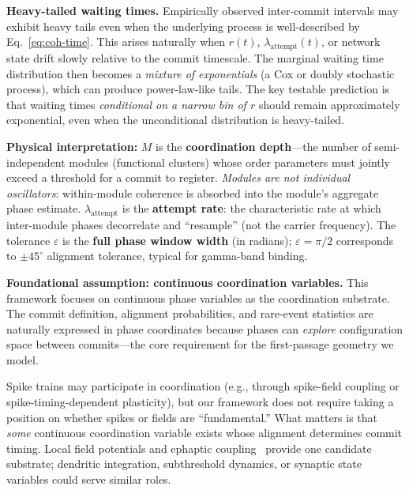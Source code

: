 \documentclass[12pt]{article}
\begin{document}
\textbf{Heavy-tailed waiting times.} Empirically observed inter-commit intervals may exhibit heavy tails even when the underlying process is well-described by Eq.~\ref{eq:coh-time}. This arises naturally when $r(t)$, $\lambda_{\mathrm{attempt}}(t)$, or network state drift slowly relative to the commit timescale. The marginal waiting time distribution then becomes a \emph{mixture of exponentials} (a Cox or doubly stochastic process), which can produce power-law-like tails. The key testable prediction is that waiting times \emph{conditional on a narrow bin of $r$} should remain approximately exponential, even when the unconditional distribution is heavy-tailed.

\textbf{Physical interpretation:} $M$ is the \textbf{coordination depth}---the number of semi-independent modules (functional clusters) whose order parameters must jointly exceed a threshold for a commit to register. \emph{Modules are not individual oscillators}: within-module coherence is absorbed into the module's aggregate phase estimate. $\lambda_{\mathrm{attempt}}$ is the \textbf{attempt rate}: the characteristic rate at which inter-module phases decorrelate and ``resample'' (not the carrier frequency). The tolerance $\varepsilon$ is the \textbf{full phase window width} (in radians); $\varepsilon = \pi/2$ corresponds to $\pm 45^\circ$ alignment tolerance, typical for gamma-band binding.

\textbf{Foundational assumption: continuous coordination variables.} This framework focuses on continuous phase variables as the coordination substrate. The commit definition, alignment probabilities, and rare-event statistics are naturally expressed in phase coordinates because phases can \emph{explore} configuration space between commits---the core requirement for the first-passage geometry we model.

Spike trains may participate in coordination (e.g., through spike-field coupling or spike-timing-dependent plasticity), but our framework does not require taking a position on whether spikes or fields are ``fundamental.'' What matters is that \emph{some} continuous coordination variable exists whose alignment determines commit timing. Local field potentials and ephaptic coupling~\cite{anastassiou2011,pinotsis2023} provide one candidate substrate; dendritic integration, subthreshold dynamics, or synaptic state variables could serve similar roles.
\end{document}

